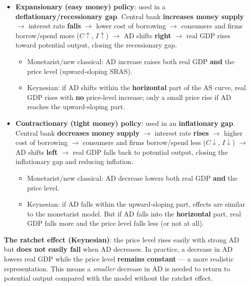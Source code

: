 \documentclass[a4paper,12pt]{article}
\begin{document}
\begin{itemize}
  \item \textbf{Expansionary (easy money) policy}: used in a \textbf{deflationary/recessionary gap}. Central bank \textbf{increases money supply} $\to$ interest rate \textbf{falls} $\to$ lower cost of borrowing $\to$ consumers and firms borrow/spend more ($C \uparrow$, $I \uparrow$) $\to$ AD shifts \textbf{right} $\to$ real GDP rises toward potential output, closing the recessionary gap.
  \begin{itemize}
    \item Monetarist/new classical: AD increase raises both real GDP \textbf{and} the price level (upward-sloping SRAS).
    \item Keynesian: if AD shifts within the \textbf{horizontal} part of the AS curve, real GDP rises with \textbf{no} price-level increase; only a small price rise if AD reaches the upward-sloping part.
  \end{itemize}
  \item \textbf{Contractionary (tight money) policy}: used in an \textbf{inflationary gap}. Central bank \textbf{decreases money supply} $\to$ interest rate \textbf{rises} $\to$ higher cost of borrowing $\to$ consumers and firms borrow/spend less ($C \downarrow$, $I \downarrow$) $\to$ AD shifts \textbf{left} $\to$ real GDP falls back to potential output, closing the inflationary gap and reducing inflation.
  \begin{itemize}
    \item Monetarist/new classical: AD decrease lowers both real GDP \textbf{and} the price level.
    \item Keynesian: if AD falls within the upward-sloping part, effects are similar to the monetarist model. But if AD falls into the \textbf{horizontal} part, real GDP falls more and the price level falls less (or not at all).
  \end{itemize}
\end{itemize}
\textbf{The ratchet effect (Keynesian)}: the price level rises easily with strong AD but \textbf{does not easily fall} when AD decreases. In practice, a decrease in AD lowers real GDP while the price level \textbf{remains constant} --- a more realistic representation. This means a \textit{smaller} decrease in AD is needed to return to potential output compared with the model without the ratchet effect.
\end{document}
